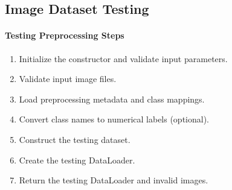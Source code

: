 \subsection{Image Dataset Testing}

\paragraph{Testing Preprocessing Steps}
\begin{enumerate}
    \item Initialize the constructor and validate input parameters.
    \item Validate input image files.
    \item Load preprocessing metadata and class mappings.
    \item Convert class names to numerical labels (optional).
    \item Construct the testing dataset.
    \item Create the testing DataLoader.
    \item Return the testing DataLoader and invalid images.
\end{enumerate}
\vspace{1cm}
